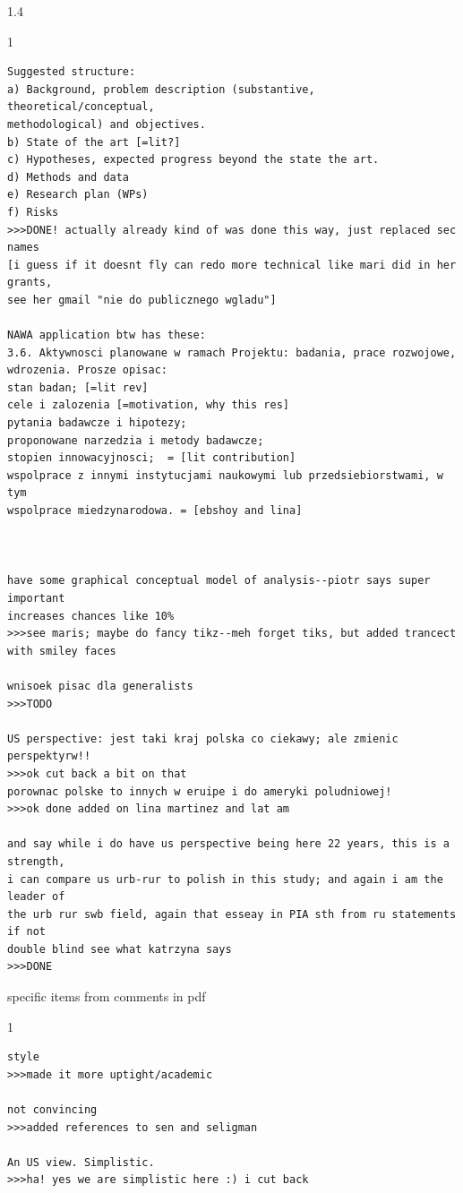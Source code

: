 \documentclass[10pt, letterpaper]{article}
\begin{document}
\begin{spacing}{1.4}
\begin{scriptsize}
\begin{spacing}{1}
\begin{verbatim}
Suggested structure:
a) Background, problem description (substantive, theoretical/conceptual,
methodological) and objectives.
b) State of the art [=lit?]
c) Hypotheses, expected progress beyond the state the art.
d) Methods and data
e) Research plan (WPs)
f) Risks
>>>DONE! actually already kind of was done this way, just replaced sec names 
[i guess if it doesnt fly can redo more technical like mari did in her grants,
see her gmail "nie do publicznego wgladu"]

NAWA application btw has these:
3.6. Aktywnosci planowane w ramach Projektu: badania, prace rozwojowe, wdrozenia. Prosze opisac: 
stan badan; [=lit rev]
cele i zalozenia [=motivation, why this res]
pytania badawcze i hipotezy; 
proponowane narzedzia i metody badawcze; 
stopien innowacyjnosci;  = [lit contribution]
wspolprace z innymi instytucjami naukowymi lub przedsiebiorstwami, w tym
wspolprace miedzynarodowa. = [ebshoy and lina]



have some graphical conceptual model of analysis--piotr says super important
increases chances like 10% 
>>>see maris; maybe do fancy tikz--meh forget tiks, but added trancect with smiley faces

wnisoek pisac dla generalists
>>>TODO

US perspective: jest taki kraj polska co ciekawy; ale zmienic perspektyrw!!
>>>ok cut back a bit on that
porownac polske to innych w eruipe i do ameryki poludniowej! 
>>>ok done added on lina martinez and lat am 

and say while i do have us perspective being here 22 years, this is a strength,
i can compare us urb-rur to polish in this study; and again i am the leader of
the urb rur swb field, again that esseay in PIA sth from ru statements if not
double blind see what katrzyna says
>>>DONE

\end{verbatim}
\end{spacing}
\end{scriptsize}



specific items from comments in pdf
\begin{scriptsize}
\begin{spacing}{1} 
\begin{verbatim}
style
>>>made it more uptight/academic

not convincing
>>>added references to sen and seligman

An US view. Simplistic.
>>>ha! yes we are simplistic here :) i cut back


\end{verbatim}
\end{spacing}
\end{scriptsize}
\end{spacing}
\end{document}
